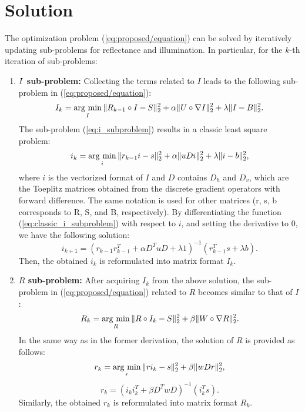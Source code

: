 \section{Solution} \label{sec:solution}
The optimization problem (\ref{eq:proposed/equation}) can be solved by iteratively updating sub-problems for reflectance and illumination. In particular, for the $k$-th iteration of sub-problems:
\begin{enumerate}
\renewcommand{\labelenumi}{\arabic{enumi}).}
\item \textbf{$\boldmath{I}$ sub-problem:} Collecting the terms related to $I$ leads to the following sub-problem in (\ref{eq:proposed/equation}):
\begin{equation}
I_{k} = \mathop{\rm arg~min}\limits_{I}\|R_{k-1} \circ I - S\|_{2}^{2} + \alpha\|U \circ \nabla{I}\|_{2}^{2} 
+\lambda \|I - B\|_{2}^{2}. \label{eq:i_subproblem}
\end{equation}
The sub-problem (\ref{eq:i_subproblem}) results in a classic least square problem:
\begin{equation}
i_{k} = \mathop{\rm arg~min}\limits_{i} \|r_{k-1} i - s\|_{2}^{2} + \alpha\|uDi\|_{2}^{2} + \lambda \|i - b\|_{2}^{2}, \label{eq:classic_i_subproblem}
\end{equation}
where $i$ is the vectorized format of $I$ and $D$ contains $D_{h}$ and $D_{v}$, which are the Toeplitz matrices obtained from the discrete gradient operators with forward difference.
The same notation is used for other matrices (r, s, b corresponds to R, S, and B, respectively). By differentiating the function (\ref{eq:classic_i_subproblem}) with respect to $i$, and setting the derivative to $0$, we have the following solution:
\begin{equation}
i_{k+1} = (r_{k-1}r_{k-1}^{T} + \alpha D^{T}uD + \lambda{1})^{-1} (r_{k-1}^{T}s + \lambda{b}). \label{eq: i_solution}
\end{equation}
Then, the obtained $i_{k}$ is reformulated into matrix format $I_{k}$.
\item \textbf{$R$ sub-problem:} After acquiring $I_{k}$ from the above solution, the sub-problem in  (\ref{eq:proposed/equation}) related to $R$ becomes similar to that of $I$:
\begin{equation}
R_{k} = \mathop{\rm arg~min}\limits_{R}\|R \circ I_{k} - S\|_{2}^{2} + \beta\|W \circ \nabla{R}\|_{2}^{2}. \label{eq: r_subproblem}
\end{equation}
In the same way as in the former derivation, the solution of $R$ is provided as follows:
\begin{equation}
r_{k} = \mathop{\rm arg~min}\limits_{r} \|ri_{k} - s\|_{2}^{2} + \beta\|wDr\|_{2}^{2}, \label{eq:classic_r_subproblem}
\end{equation}
\begin{equation}
r_{k} = (i_{k}i_{k}^{T} + \beta D^{T}wD)^{-1} (i_{k}^{T}s). \label{eq: solution_r_subproblem}
\end{equation}
Similarly, the obtained $r_{k}$ is reformulated into matrix format $R_{k}$.
\end{enumerate}
